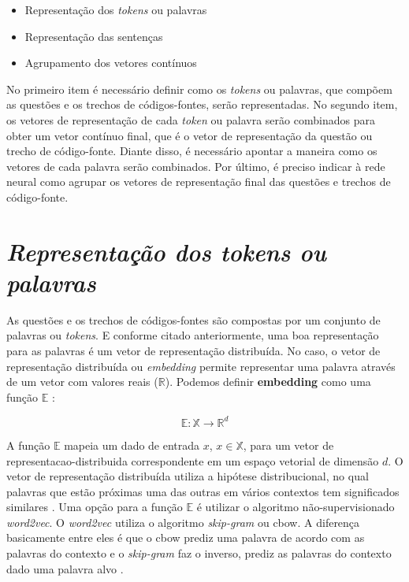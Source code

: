 \begin{itemize}
    \item Representação dos \textit{tokens} ou palavras
    \item Representação das sentenças
    \item Agrupamento dos vetores contínuos 
\end{itemize}


No primeiro item é necessário definir como os \textit{tokens} ou palavras, que compõem as questões e os trechos de códigos-fontes, serão representadas. No segundo item, os vetores de representação de cada \textit{token} ou palavra serão combinados para obter um vetor contínuo final, que é o vetor de representação da questão ou trecho de código-fonte. Diante disso, é necessário apontar a maneira como os vetores de cada palavra serão combinados. Por último, é preciso indicar à rede neural como agrupar os vetores de representação final das questões e trechos de código-fonte.


\section{\textit{Representação dos \textit{tokens} ou palavras}}
\label{sec:fundamentao-representacao-tokens-palavras}

As questões e os trechos de códigos-fontes são compostas por um conjunto de palavras ou \textit{tokens}. E conforme citado anteriormente, uma boa representação para as palavras é um vetor de representação distribuída. No caso, o vetor de representação distribuída ou \textit{embedding} permite representar uma palavra através de um vetor com valores reais ($\mathbb{R}$). Podemos definir \textbf{embedding} como uma função $\mathbb{E}$ \citep{cambronero-deep-learning-code-search:2019}:

\begin{equation}
    \mathbb{E}: \mathbb{X} \rightarrow \mathbb{R}^{d}
\end{equation}

A função $\mathbb{E}$ mapeia um dado de entrada $x$, $x \in \mathbb{X}$, para um vetor de \gls{representacao-distribuida} correspondente em um espaço vetorial de dimensão $d$. O vetor de representação distribuída utiliza a hipótese distribucional, no qual palavras que estão próximas uma das outras em vários contextos tem significados similares \citep{Goodfellow-et-al-2016}. Uma opção para a função $\mathbb{E}$ é utilizar o algoritmo não-supervisionado \textit{word2vec}. O \textit{word2vec} utiliza o algoritmo \textit{skip-gram} ou \acrshort{cbow}. A diferença basicamente entre eles é que o \acrshort{cbow} prediz uma palavra de acordo com as palavras do contexto e o \textit{skip-gram} faz o inverso, prediz as palavras do contexto dado uma palavra alvo \citep{mikolov2013distributed}.

